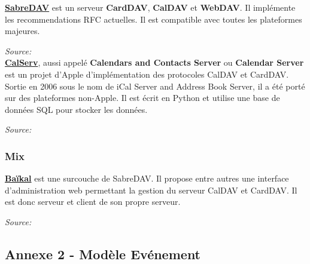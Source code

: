 \underline{\textbf{SabreDAV}} est un serveur \textbf{CardDAV}, \textbf{CalDAV} et \textbf{WebDAV}. Il implémente les recommendations RFC actuelles. Il est compatible avec toutes les plateformes majeures.

\textit{Source: }\\

\underline{\textbf{CalServ}}, aussi appelé \textbf{Calendars and Contacts Server} ou \textbf{Calendar Server} est un projet d'Apple d'implémentation des protocoles CalDAV et CardDAV. Sortie en 2006 sous le nom de iCal Server and Address Book Server, il a été porté sur des plateformes non-Apple. Il est écrit en Python et utilise une base de données SQL pour stocker les données.

\textit{Source: }\\


\subsubsection*{Mix}

\underline{\textbf{Baïkal}} est une surcouche de SabreDAV. Il propose entre autres une interface d'administration web permettant la gestion du serveur CalDAV et CardDAV. Il est donc serveur et client de son propre serveur.

\textit{Source: }

\clearpage

\subsection*{Annexe 2 - Modèle Evénement}


